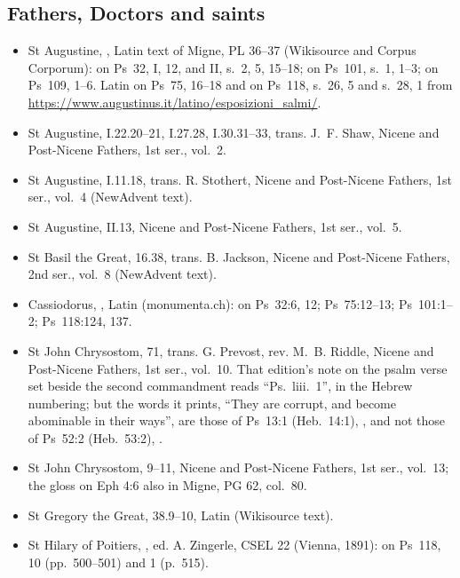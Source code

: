 {\subsection*{Fathers, Doctors and saints}
\begin{itemize}
\item St Augustine, , Latin text of Migne, PL 36--37 (Wikisource and Corpus Corporum): on Ps~32, I, 12, and II, s.~2, 5, 15--18; on Ps~101, s.~1, 1--3; on Ps~109, 1--6. Latin on Ps~75, 16--18 and on Ps~118, s.~26, 5 and s.~28, 1 from \url{https://www.augustinus.it/latino/esposizioni_salmi/}.
\item St Augustine,  I.22.20--21, I.27.28, I.30.31--33, trans. J.~F. Shaw, Nicene and Post-Nicene Fathers, 1st ser., vol.~2.
\item St Augustine,  I.11.18, trans. R. Stothert, Nicene and Post-Nicene Fathers, 1st ser., vol.~4 (NewAdvent text).
\item St Augustine,  II.13, Nicene and Post-Nicene Fathers, 1st ser., vol.~5.
\item St Basil the Great,  16.38, trans. B. Jackson, Nicene and Post-Nicene Fathers, 2nd ser., vol.~8 (NewAdvent text).
\item Cassiodorus, , Latin (monumenta.ch): on Ps~32:6, 12; Ps~75:12--13; Ps~101:1--2; Ps~118:124, 137.
\item St John Chrysostom,  71, trans. G. Prevost, rev. M.~B. Riddle, Nicene and Post-Nicene Fathers, 1st ser., vol.~10. That edition's note on the psalm verse set beside the second commandment reads ``Ps.\ liii.\ 1'', in the Hebrew numbering; but the words it prints, ``They are corrupt, and become abominable in their ways'', are those of Ps~13:1 (Heb.\ 14:1), , and not those of Ps~52:2 (Heb.\ 53:2), .
\item St John Chrysostom,  9--11, Nicene and Post-Nicene Fathers, 1st ser., vol.~13; the gloss on Eph 4:6 also in Migne, PG 62, col.~80.
\item St Gregory the Great,  38.9--10, Latin (Wikisource text).
\item St Hilary of Poitiers, , ed. A. Zingerle, CSEL 22 (Vienna, 1891): on Ps~118,  10 (pp.~500--501) and  1 (p.~515).

\end{itemize}}
